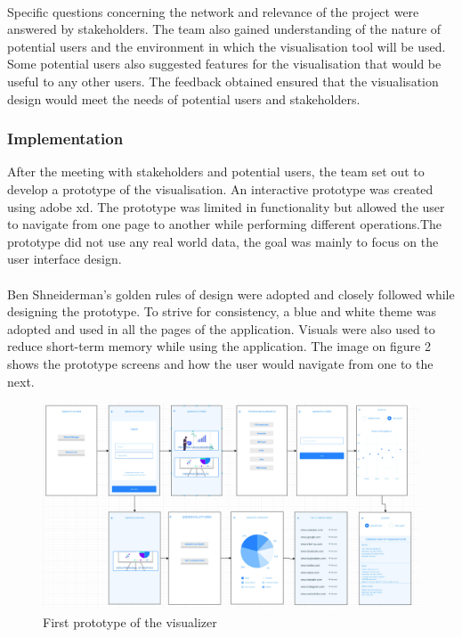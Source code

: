 \paragraph{}
Specific questions concerning the network and relevance of the project were answered by stakeholders. The team also gained understanding of the nature of potential users and the environment in which the visualisation tool will be used. Some potential users also suggested features for the visualisation that would be useful to any other users. The feedback obtained ensured that the visualisation design would meet the needs of potential users and stakeholders.

\subsubsection{Implementation}
After the meeting with stakeholders and potential users, the team set out to develop a prototype of the visualisation. An interactive prototype was created using adobe xd. The prototype was limited in functionality but allowed the user to navigate from one page to another while performing different operations.The prototype did not use any real world data, the goal was mainly to focus on the user interface design.
\paragraph{}
Ben Shneiderman's golden rules of design were adopted and closely followed while designing the prototype. To strive for consistency, a blue and white theme was adopted and used in all the pages of the application. Visuals were also used to reduce short-term memory while using the application. The image on figure 2 shows the prototype screens and how the user would navigate from one to the next.


\begin{figure}
	\centering
	\includegraphics[width=1\linewidth]{images/proto}
	\caption{First prototype of the visualizer}
	\label{fig:proto}
\end{figure}

